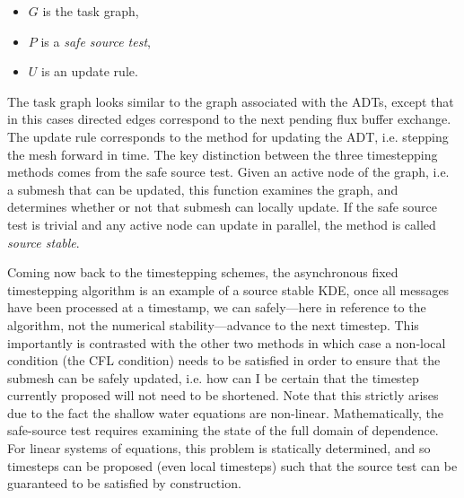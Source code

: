 \begin{itemize}
\item $G$ is the task graph,
\item $P$ is a {\em safe source test},
\item $U$ is an update rule.
\end{itemize}
The task graph looks similar to the graph associated with the ADTs, except that in this cases directed edges correspond to the next pending flux buffer exchange. The update rule corresponds to the method for updating the ADT, i.e. stepping the mesh forward in time. The key distinction between the three timestepping methods comes from the safe source test. Given an active node of the graph, i.e. a submesh that can be updated, this function examines the graph, and determines whether or not that submesh can locally update. If the safe source test is trivial and any active node can update in parallel, the method is called {\em source stable}.

Coming now back to the timestepping schemes, the asynchronous fixed timestepping algorithm is an example of a source stable KDE, once all messages have been processed at a timestamp, we can safely---here in reference to the algorithm, not the numerical stability---advance to the next timestep. This importantly is contrasted with the other two methods in which case a non-local condition (the CFL condition) needs to be satisfied in order to ensure that the submesh can be safely updated, i.e. how can I be certain that the timestep currently proposed will not need to be shortened. Note that this strictly arises due to the fact the shallow water equations are non-linear. Mathematically, the safe-source test requires examining the state of the full domain of dependence. For linear systems of equations, this problem is statically determined, and so timesteps can be proposed (even local timesteps) such that the source test can be guaranteed to be satisfied by construction.

